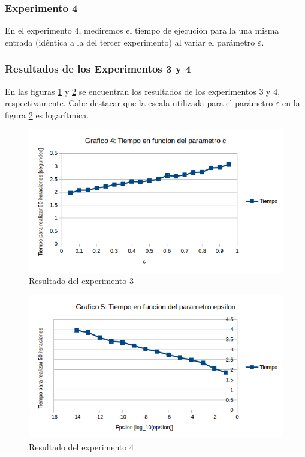 \subsubsection{Experimento 4}
\par En el experimento 4, mediremos el tiempo de ejecuci\'on para la una misma entrada (id\'entica a la del tercer experimento) al variar el par\'ametro $\varepsilon$.

\subsubsection{Resultados de los Experimentos 3 y 4}
\par En las figuras \ref{fig:res3} y \ref{fig:res4} se encuentran los resultados de los experimentos 3 y 4, respectivamente.
Cabe destacar que la escala utilizada para el par\'ametro $\varepsilon$ en la figura \ref{fig:res4} es logar\'itmica.
\FloatBarrier

\begin{figure}[ht]
\begin{center}
\includegraphics[width=0.8\columnwidth]{imagenes/graf4}
\caption{Resultado del experimento 3}
\label{fig:res3}
\end{center}
\end{figure}

\begin{figure}[ht]
\begin{center}
\includegraphics[width=0.8\columnwidth]{imagenes/graf5}
\caption{Resultado del experimento 4}
\label{fig:res4}
\end{center}
\end{figure}
\FloatBarrier

